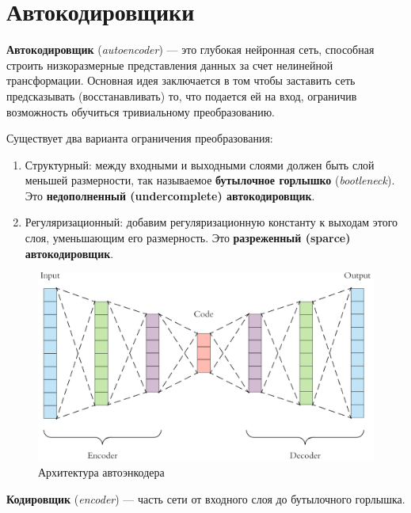 \section{Автокодировщики}

\begin{definition}
    \textbf{Автокодировщик} (\textit{autoencoder}) --- это глубокая нейронная сеть, способная строить низкоразмерные представления данных за счет нелинейной трансформации. Основная идея заключается в том чтобы заставить сеть предсказывать (восстанавливать) то, что подается ей на вход, ограничив возможность обучиться тривиальному преобразованию.
\end{definition}

Существует два варианта ограничения преобразования:
\begin{enumerate}
    \item Структурный: между входными и выходными слоями должен быть слой меньшей размерности, так называемое \textbf{бутылочное горлышко} (\textit{bootleneck}). Это \textbf{недополненный (undercomplete) автокодировщик}.
    \item Регуляризационный: добавим регуляризационную константу к выходам этого слоя, уменьшающим его размерность. Это \textbf{разреженный (sparce) автокодировщик}.
\end{enumerate}

\begin{figure}[h]
    \centering
    \includegraphics[width=\textwidth]{images/autoencoder.png}
    \caption{Архитектура автоэнкодера}
\end{figure}

\begin{definition}
    \textbf{Кодировщик} (\textit{encoder}) --- часть сети от входного слоя до бутылочного горлышка.
\end{definition}

